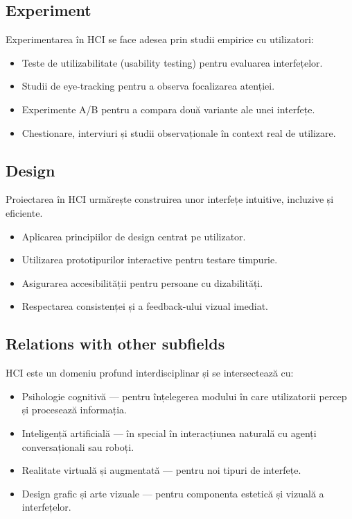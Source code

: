 \documentclass[12pt, letterpaper]{article}
\begin{document}
\subsection*{Experiment}
Experimentarea în HCI se face adesea prin studii empirice cu utilizatori:
\begin{itemize}
    \item Teste de utilizabilitate (usability testing) pentru evaluarea interfețelor.
    \item Studii de eye-tracking pentru a observa focalizarea atenției.
    \item Experimente A/B pentru a compara două variante ale unei interfețe.
    \item Chestionare, interviuri și studii observaționale în context real de utilizare.
\end{itemize}

\subsection*{Design}
Proiectarea în HCI urmărește construirea unor interfețe intuitive, incluzive și eficiente.
\begin{itemize}
    \item Aplicarea principiilor de design centrat pe utilizator.
    \item Utilizarea prototipurilor interactive pentru testare timpurie.
    \item Asigurarea accesibilității pentru persoane cu dizabilități.
    \item Respectarea consistenței și a feedback-ului vizual imediat.
\end{itemize}

\subsection*{Relations with other subfields}
HCI este un domeniu profund interdisciplinar și se intersectează cu:
\begin{itemize}
    \item Psihologie cognitivă — pentru înțelegerea modului în care utilizatorii percep și procesează informația.
    \item Inteligență artificială — în special în interacțiunea naturală cu agenți conversaționali sau roboți.
    \item Realitate virtuală și augmentată — pentru noi tipuri de interfețe.
    \item Design grafic și arte vizuale — pentru componenta estetică și vizuală a interfețelor.
\end{itemize}
\end{document}
